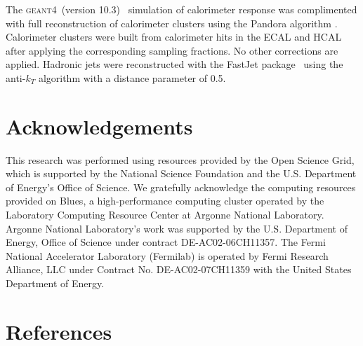 \documentclass[final,1p,11pt]{elsarticle}
\newcommand{\GEANTfour} {\textsc{geant4}}
\begin{document}
The \GEANTfour\ (version 10.3)~\cite{Allison2016186} simulation of calorimeter response was complimented
with full reconstruction of calorimeter clusters using the Pandora algorithm \cite{Charles:2009ta,Marshall:2013bda}.
Calorimeter clusters were built from calorimeter hits in the  ECAL and HCAL after applying the corresponding sampling fractions.
No other corrections are applied.
Hadronic jets were 
reconstructed with the {\sc FastJet} package~\cite{fastjet} using the anti-$k_T$ algorithm \cite{Cacciari:2008gp}
with  a distance parameter of 0.5. 












\section*{Acknowledgements}
This research was performed using resources provided by the Open Science Grid,
which is supported by the National Science Foundation and the U.S. Department of Energy's Office of Science. 
We gratefully acknowledge the computing resources provided on Blues, 
a high-performance computing cluster operated by the Laboratory Computing Resource Center at Argonne National Laboratory.
Argonne National Laboratory's work was supported by the U.S. Department of Energy, Office of Science under contract DE-AC02-06CH11357.
The Fermi National Accelerator Laboratory (Fermilab) is operated by Fermi Research Alliance, LLC under Contract No. DE-AC02-07CH11359 with the United States Department of Energy.

\newpage
\section*{References}


\def\bibname{\Large\bf References}
\def\refname{\Large\bf References}
\pagestyle{plain}

\end{document}
